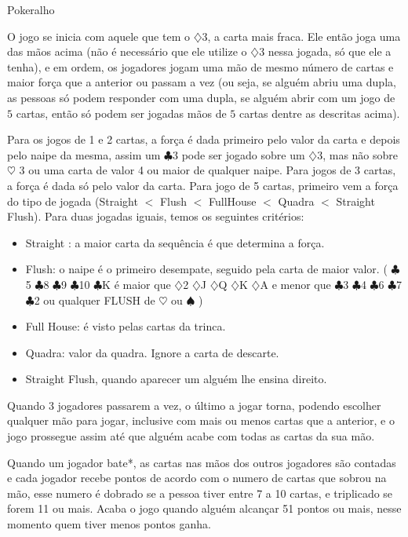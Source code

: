 \begin{subsecao}{Pokeralho}
\begin{itemize}
\end{itemize}

O jogo se inicia com aquele que tem o $\diamondsuit$3, a carta mais fraca. Ele
então joga uma das mãos acima (não é necessário que ele utilize
o $\diamondsuit$3 nessa jogada, só que ele a tenha), e em ordem, os jogadores
jogam uma mão de mesmo número de cartas e maior força que a anterior ou passam
a vez (ou seja, se alguém abriu uma dupla, as pessoas só podem responder com
uma dupla, se alguém abrir com um jogo de $5$ cartas, então só podem ser
jogadas mãos de $5$ cartas dentre as descritas acima). 

Para os jogos de 1 e 2 cartas, a força é dada primeiro pelo valor da carta e
depois pelo naipe da mesma, assim um $\clubsuit$3  pode ser jogado sobre
um $\diamondsuit$3, mas não sobre $\heartsuit$ 3 ou uma carta de valor 4 ou
maior de qualquer naipe. Para jogos de 3 cartas, a força é dada só pelo valor
da carta. Para jogo de 5 cartas, primeiro vem a força do tipo de
jogada (Straight $<$ Flush $<$ FullHouse $<$ Quadra $<$ Straight Flush). Para duas
jogadas iguais, temos os seguintes critérios:
\begin{itemize}
	\item Straight : a maior carta da sequência é que determina a força.
	\item Flush: o naipe é o primeiro desempate, seguido pela carta de maior
valor.  ( $\clubsuit$5 $\clubsuit$8 $\clubsuit$9 $\clubsuit$10 $\clubsuit$K é
maior que $\diamondsuit$2 $\diamondsuit$J $\diamondsuit$Q $\diamondsuit$K
$\diamondsuit$A e menor que $\clubsuit$3 $\clubsuit$4 $\clubsuit$6 $\clubsuit$7
$\clubsuit$2 ou qualquer FLUSH de $\heartsuit$  ou $\spadesuit$  )
	\item Full House: é visto pelas cartas da trinca.	
	\item Quadra: valor da quadra. Ignore a carta de descarte.
	\item Straight Flush, quando aparecer um alguém lhe ensina direito.
\end{itemize}

Quando 3 jogadores passarem a vez, o último a jogar torna, podendo escolher
qualquer mão para jogar, inclusive com mais ou menos cartas que a anterior, e o
jogo prossegue assim até que alguém acabe com todas as cartas da sua mão. 

Quando um jogador bate*, as cartas nas mãos dos outros jogadores são contadas e
cada jogador recebe pontos de acordo com o numero de cartas que sobrou na mão,
esse numero é dobrado se a pessoa tiver entre 7 a 10 cartas, e triplicado se
forem 11 ou mais. Acaba o jogo quando alguém alcançar 51 pontos ou mais, nesse
momento quem tiver menos pontos ganha.


\end{subsecao}
